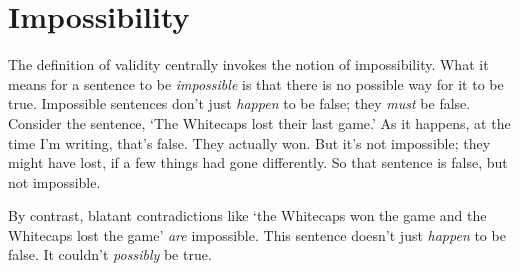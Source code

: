 %
%
%
%
%

\section{Impossibility}
\label{sec.impossible}

The definition of validity centrally invokes the notion of impossibility. What it means for a sentence to be \emph{impossible} is that there is no possible way for it to be true. Impossible sentences don't just \emph{happen} to be false; they \emph{must} be false. Consider the sentence, `The Whitecaps lost their last game.' As it happens, at the time I'm writing, that's false. They actually won. But it's not impossible; they might have lost, if a few things had gone differently. So that sentence is false, but not impossible.

By contrast, blatant contradictions like `the Whitecaps won the game and the Whitecaps lost the game' \emph{are} impossible. This sentence doesn't just \emph{happen} to be false. It couldn't \emph{possibly} be true.

